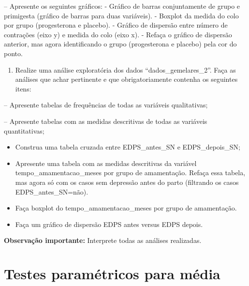 \documentclass[
]{book}
\providecommand{\tightlist}{%
  \setlength{\itemsep}{0pt}\setlength{\parskip}{0pt}}
\begin{document}
-- Apresente os seguintes gráficos:
- Gráfico de barras conjuntamente de grupo e primigesta (gráfico de barras para duas variáveis).
- Boxplot da medida do colo por grupo (progesterona e placebo).
- Gráfico de dispersão entre número de contrações (eixo y) e medida do colo (eixo x).
- Refaça o gráfico de dispersão anterior, mas agora identificando o grupo (progesterona e placebo) pela cor do ponto.

\begin{enumerate}
\def\labelenumi{\arabic{enumi}.}
\setcounter{enumi}{1}
\tightlist
\item
  Realize uma análise exploratória dos dados ``dados\_gemelares\_2''. Faça as análises que achar pertinente e que obrigatoriamente contenha os seguintes itens:
\end{enumerate}

-- Apresente tabelas de frequências de todas as variáveis qualitativas;

-- Apresente tabelas com as medidas descritivas de todas as variáveis quantitativas;

\begin{itemize}
\item
  Construa uma tabela cruzada entre EDPS\_antes\_SN e EDPS\_depois\_SN;
\item
  Apresente uma tabela com as medidas descritivas da variável tempo\_amamentacao\_meses por grupo de amamentação. Refaça essa tabela, mas agora só com os casos sem depressão antes do parto (filtrando os casos EDPS\_antes\_SN=não).
\item
  Faça boxplot do tempo\_amamentacao\_meses por grupo de amamentação.
\item
  Faça um gráfico de dispersão EDPS antes versus EDPS depois.
\end{itemize}

\textbf{Observação importante:} Interprete todas as análises realizadas.

\hypertarget{testes-paramuxe9tricos-para-muxe9dia}{%
\chapter{Testes paramétricos para média}\label{testes-paramuxe9tricos-para-muxe9dia}}

  
\end{document}
